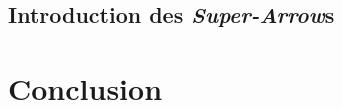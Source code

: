 \documentclass{llncs}
\newcommand{\SAs}{\emph{Super-Arrow}s }
\begin{document}
\subsection{Introduction des \SAs}

\section{Conclusion}





\end{document}

